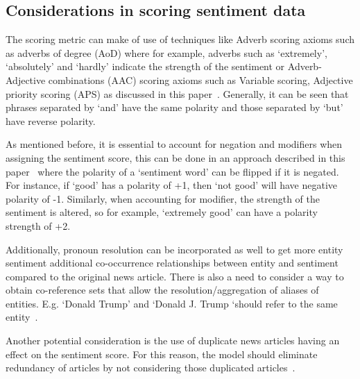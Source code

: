 \subsection{Considerations in scoring sentiment data} \label{sentiment_scoring}

The scoring metric can make of use of techniques like Adverb scoring axioms such as adverbs of degree (AoD) where for example, adverbs such as `extremely', `absolutely' and `hardly' indicate the strength of the sentiment or  Adverb-Adjective combinations (AAC) scoring axioms such as Variable scoring, Adjective priority scoring (APS) as discussed in this paper~\cite{17_benamara2007sentiment}. Generally, it can be seen that phrases separated by `and' have the same polarity and those separated by `but' have reverse polarity. 

As mentioned before, it is essential to account for negation and modifiers when assigning the sentiment score, this can be done in an approach described in this paper~\cite{22_godbole2007large} where the polarity of a `sentiment word' can be flipped if it is negated. For instance, if `good' has a polarity of +1, then `not good' will have negative polarity of -1. Similarly, when accounting for modifier, the strength of the sentiment is altered, so for example, `extremely good' can have a polarity strength of +2. 

Additionally, pronoun resolution can be incorporated as well to get more entity sentiment additional co-occurrence relationships between entity and sentiment compared to the original news article. There is also a need to consider a way to obtain co-reference sets that allow the resolution/aggregation of aliases of entities. E.g. `Donald Trump' and `Donald J. Trump `should refer to the same entity~\cite{22_godbole2007large}.

Another potential consideration is the use of duplicate news articles having an effect on the sentiment score. For this reason, the model should eliminate redundancy of articles by not considering those duplicated articles~\cite{22_godbole2007large}.
